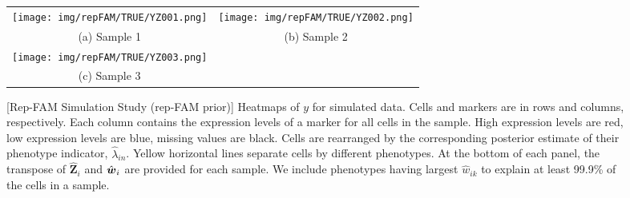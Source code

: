 \documentclass[12pt,]{article}
\def\Z{\bm{Z}}
\newcommand{\bw}{\mbox{\boldmath $w$}}
\begin{document}
\begin{figure}[H]
  \begin{center}
  \begin{tabular}{cc}
  \texttt{[image: img/repFAM/TRUE/YZ001.png]}&
  \texttt{[image: img/repFAM/TRUE/YZ002.png]}\\
  {\small (a) Sample 1} & {\small(b) Sample 2} \\
  \texttt{[image: img/repFAM/TRUE/YZ003.png]}&\\
  {\small (c) Sample 3} & \\
  \end{tabular}
  \end{center}
  \vspace{-0.05in}
  \caption{\small[Rep-FAM Simulation Study (rep-FAM prior)]  Heatmaps of $y$
    for simulated data.  Cells and markers are in rows and columns,
    respectively. Each column contains the expression levels of a marker for
    all cells in the sample.  High expression levels are red, low expression
    levels are blue, missing values are black.  Cells are rearranged by the
    corresponding posterior estimate of their phenotype indicator,
    $\hat{\lambda}_{in}$.  Yellow horizontal lines separate cells by different
    phenotypes.  At the bottom of each panel, the transpose of $\hat{\Z}_i$ and
    $\hat{\bw}_i$ are provided for each sample.  We include phenotypes having
    largest $\hat{w}_{ik}$ to explain at least 99.9\% of the cells in a sample.}
\label{fig:repFAM-TRUE-post-Z}
\end{figure}
\end{document}
